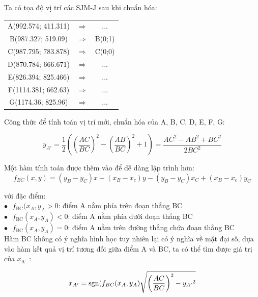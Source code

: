 Ta có tọa độ vị trí các SJM-J sau khi chuẩn hóa:\*

\begin{tabular}{c c c}
A(992.574; 411.311) & $\Rightarrow$ & ... \\ 
B(987.327; 519.09) & $\Rightarrow$ & B(0;1) \\ 
C(987.795; 783.878) & $\Rightarrow$ & C(0;0) \\ 
D(870.784; 666.671) & $\Rightarrow$ & ... \\ 
E(826.394; 825.466) & $\Rightarrow$ & ... \\ 
F(1114.381; 662.63) & $\Rightarrow$ & ... \\ 
G(1174.36; 825.96) & $\Rightarrow$ & ... \\ 
\end{tabular} \*

Công thức để tính toán vị trí mới, chuẩn hóa của A, B, C, D, E, F, G:

\begin{equation}
{y_{A'}} = \frac{1}{2}\left( {{{\left( {\frac{{AC}}{{BC}}} \right)}^2} - {{\left( {\frac{{AB}}{{BC}}} \right)}^2} + 1} \right) = \frac{{A{C^2} - A{B^2} + B{C^2}}}{{2B{C^2}}}
\end{equation}

Một hàm tính toán được thêm vào để dễ dàng lập trình hơn:
\begin{equation}
{f_{BC}}(x,y) = ({y_B} - {y_C})x - ({x_B} - {x_c})y - ({y_B} - {y_C}){x_C} + ({x_B} - {x_c}){y_C}
\end{equation}

với đặc điểm:\\

$\bullet \text{   }  f_\text{BC}(x_A,y_A > 0$: điểm A nằm phía trên đoạn thẳng BC\\

$\bullet \text{   }  f_\text{BC}(x_A,y_A)< 0$: điểm A nằm phía dưới đoạn thẳng BC\\

$\bullet \text{   } f_\text{BC}(x_A,y_A)= 0$: điểm A nằm trên đường thẳng chứa đoạn thẳng BC\\

Hàm BC không có ý nghĩa hình học tuy nhiên lại có ý nghĩa về mặt đại số, dựa vào hàm kết quả vị trí tương đối giữa điểm A và BC, ta có thể tìm được giá trị của $x_\text{A'}$ :

\begin{equation}
{x_{A'}} = {\mathop{\rm sgn}} ({f_{BC}}({x_A},{y_A})\sqrt {{{\left( {\frac{{AC}}{{BC}}} \right)}^2} - {y_{A'}}^2} 
\end{equation}

